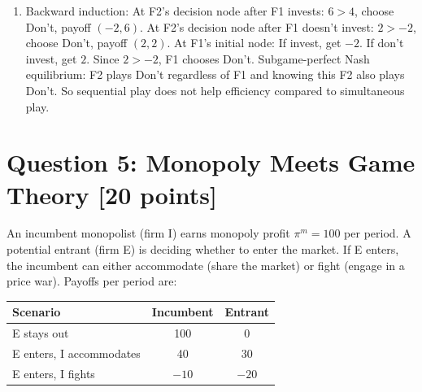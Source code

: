 \documentclass[11pt]{article}
\begin{document}
\begin{enumerate}[label=(\alph*)]
\item[] Backward induction: At F2's decision node after F1 invests: $6>4$, choose Don't, payoff $(-2,6)$. At F2's decision node after F1 doesn't invest: $2>-2$, choose Don't, payoff $(2,2)$. At F1's initial node: If invest, get $-2$. If don't invest, get $2$. Since $2>-2$, F1 chooses Don't. Subgame-perfect Nash equilibrium: F2 plays Don't regardless of F1 and knowing this F2 also plays Don't. So sequential play does not help efficiency compared to simultaneous play.
\end{enumerate}

\section*{Question 5: Monopoly Meets Game Theory [20 points]}

An incumbent monopolist (firm I) earns monopoly profit $\pi^m = 100$ per period. A potential entrant (firm E) is deciding whether to enter the market. If E enters, the incumbent can either accommodate (share the market) or fight (engage in a price war). Payoffs per period are:

\begin{center}
\begin{tabular}{lcc}
\hline
Scenario & Incumbent & Entrant \\
\hline
E stays out & 100 & 0 \\
E enters, I accommodates & 40 & 30 \\
E enters, I fights & $-10$ & $-20$ \\
\hline
\end{tabular}
\end{center}
\end{document}

